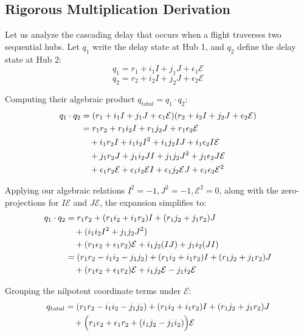 \documentclass[11pt,a4paper]{book}
\begin{document}
\subsection{Rigorous Multiplication Derivation}
Let us analyze the cascading delay that occurs when a flight traverses two sequential hubs. Let $q_1$ write the delay state at Hub 1, and $q_2$ define the delay state at Hub 2:
\begin{equation}
    q_1 = r_1 + i_1 I + j_1 J + \epsilon_1 \mathcal{E}
\end{equation}
\begin{equation}
    q_2 = r_2 + i_2 I + j_2 J + \epsilon_2 \mathcal{E}
\end{equation}

Computing their algebraic product $q_{total} = q_1 \cdot q_2$:
\begin{align}
    q_1 \cdot q_2 &= (r_1 + i_1 I + j_1 J + \epsilon_1 \mathcal{E})(r_2 + i_2 I + j_2 J + \epsilon_2 \mathcal{E}) \notag \\
    &= r_1 r_2 + r_1 i_2 I + r_1 j_2 J + r_1 \epsilon_2 \mathcal{E} \notag \\
    &\quad + i_1 r_2 I + i_1 i_2 I^2 + i_1 j_2 I J + i_1 \epsilon_2 I\mathcal{E} \notag \\
    &\quad + j_1 r_2 J + j_1 i_2 J I + j_1 j_2 J^2 + j_1 \epsilon_2 J\mathcal{E} \notag \\
    &\quad + \epsilon_1 r_2 \mathcal{E} + \epsilon_1 i_2 \mathcal{E} I + \epsilon_1 j_2 \mathcal{E} J + \epsilon_1 \epsilon_2 \mathcal{E}^2
\end{align}

Applying our algebraic relations $I^2 = -1, J^2 = -1, \mathcal{E}^2 = 0$, along with the zero-projections for $I\mathcal{E}$ and $J\mathcal{E}$, the expansion simplifies to:
\begin{align}
    q_1 \cdot q_2 &= r_1 r_2 + (r_1 i_2 + i_1 r_2) I + (r_1 j_2 + j_1 r_2) J \notag \\
    &\quad + (i_1 i_2 I^2 + j_1 j_2 J^2) \notag \\
    &\quad + (r_1 \epsilon_2 + \epsilon_1 r_2) \mathcal{E} + i_1 j_2 (I J) + j_1 i_2 (J I) \notag \\
    &= (r_1 r_2 - i_1 i_2 - j_1 j_2) + (r_1 i_2 + i_1 r_2) I + (r_1 j_2 + j_1 r_2) J \notag \\
    &\quad + (r_1 \epsilon_2 + \epsilon_1 r_2)\mathcal{E} + i_1 j_2 \mathcal{E} - j_1 i_2 \mathcal{E}
\end{align}

Grouping the nilpotent coordinate terms under $\mathcal{E}$:
\begin{align}
    q_{total} &= (r_1 r_2 - i_1 i_2 - j_1 j_2) + (r_1 i_2 + i_1 r_2) I + (r_1 j_2 + j_1 r_2) J \notag \\
    &\quad + \Big( r_1 \epsilon_2 + \epsilon_1 r_2 + (i_1 j_2 - j_1 i_2) \Big) \mathcal{E}
\end{align}
\end{document}
